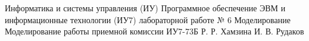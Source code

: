 \documentclass{bmstu}
\begin{document}
\makereporttitle
	{Информатика и системы управления (ИУ)}
	{Программное обеспечение ЭВМ и информационные технологии (ИУ7)}
	{лабораторной работе № 6}
	{Моделирование}
	{Моделирование работы приемной комиссии}
	{}
	{ИУ7-73Б}
	{Р. Р. Хамзина}
	{И. В. Рудаков}

\maketableofcontents


\end{document}
